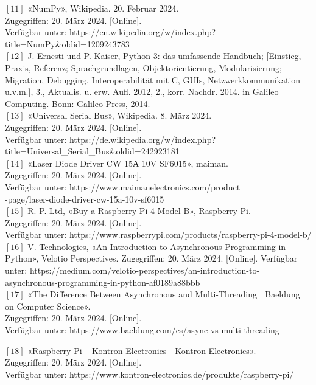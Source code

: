 $[11]$	«NumPy», Wikipedia. 20. Februar 2024.\\
Zugegriffen: 20. März 2024. [Online].\\
Verfügbar unter: https://en.wikipedia.org/w/index.php?title=NumPy\&oldid=1209243783\\

$[12]$	J. Ernesti und P. Kaiser, Python 3: das umfassende Handbuch; [Einstieg, Praxis, Referenz; Sprachgrundlagen, Objektorientierung, Modularisierung; Migration, Debugging, Interoperabilität mit C, GUIs, Netzwerkkommunikation u.v.m.], 3., Aktualis. u. erw. Aufl. 2012, 2., korr. Nachdr. 2014. in Galileo Computing. Bonn: Galileo Press, 2014.\\

$[13]$	«Universal Serial Bus», Wikipedia. 8. März 2024.\\
Zugegriffen: 20. März 2024. [Online].\\
Verfügbar unter: https://de.wikipedia.org/w/index.php?\\ title=Universal\_Serial\_Bus\&oldid=242923181\\

$[14]$	«Laser Diode Driver CW 15А 10V SF6015», maiman.\\
Zugegriffen: 20. März 2024. [Online].\\
Verfügbar unter: https://www.maimanelectronics.com/product\\
-page/laser-diode-driver-cw-15a-10v-sf6015\\

$[15]$ R. P. Ltd, «Buy a Raspberry Pi 4 Model B», Raspberry Pi.\\
Zugegriffen: 20. März 2024. [Online].\\
Verfügbar unter: https://www.raspberrypi.com/products/raspberry-pi-4-model-b/\\

$[16]$ V. Technologies, «An Introduction to Asynchronous Programming in Python», Velotio Perspectives. Zugegriffen: 20. März 2024. [Online]. Verfügbar unter: https://medium.com/velotio-perspectives/an-introduction-to-asynchronous-programming-in-python-af0189a88bbb\\

$[17]$ «The Difference Between Asynchronous and Multi-Threading | Baeldung on Computer Science».\\
Zugegriffen: 20. März 2024. [Online].\\
Verfügbar unter: https://www.baeldung.com/cs/async-vs-multi-threading

$[18]$ «Raspberry Pi – Kontron Electronics - Kontron Electronics».\\
Zugegriffen: 20. März 2024. [Online].\\
Verfügbar unter: https://www.kontron-electronics.de/produkte/raspberry-pi/


